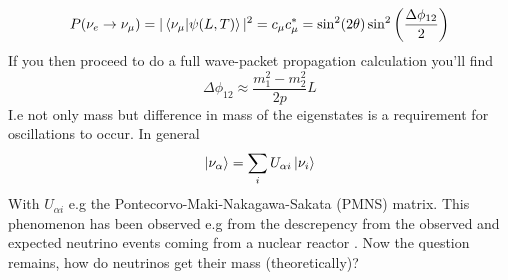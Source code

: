 \documentclass[11pt,a4paper,faculty=we,language=en,doctype=report]{cls/ugent-doc}
\begin{document}
\begin{equation}
	P(\nu_e\rightarrow\nu_\mu) = |\braket{\nu_\mu|\psi(L,T)}|^2 = c_\mu c_\mu^* = \sin ^2(2 \theta) \sin ^2\left(\frac{\Delta \phi_{12}}{2}\right)
\end{equation}
If you then proceed to do a full wave-packet propagation calculation you'll find
\begin{equation}
	\Delta \phi_{12} \approx \frac{m_1^2 - m_2^2}{2p}L
\end{equation}
I.e not only mass but difference in mass of the eigenstates is a requirement for oscillations to occur.
In general
\begin{equation}
	\ket{\nu_\alpha} = \sum_iU_{\alpha i} \ket{\nu_i}
\end{equation}
With $U_{\alpha i}$ e.g the Pontecorvo-Maki-Nakagawa-Sakata (PMNS) matrix. 
This phenomenon has been observed e.g from the descrepency from the observed
and expected neutrino events coming from a nuclear reactor \cite{Eguchi_2003}.
Now the question remains, how do neutrinos get their mass (theoretically)?
\end{document}
